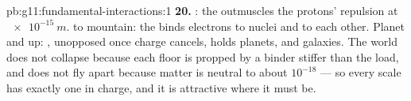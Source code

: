 \begin{solution}{pb:g11:fundamental-interactions:1}
\textbf{20.} : the  outmuscles the protons'
repulsion at $\qty{e-15}{m}$.  to mountain: the  binds electrons to nuclei and  to each other. Planet
and up: , unopposed once charge cancels, holds planets,
 and galaxies. The world does not collapse because each floor is
propped by a binder stiffer than the load, and does not fly apart
because matter is neutral to about $10^{-18}$ --- so every scale has
exactly one  in charge, and it is attractive where it must be.
\end{solution}
